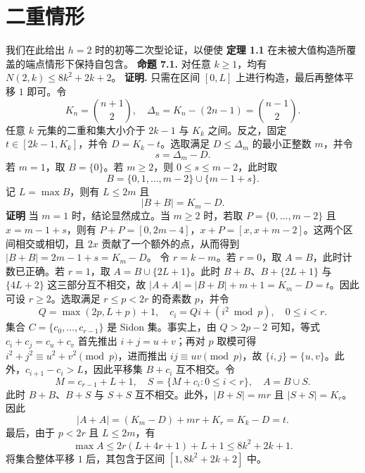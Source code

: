 \documentclass[11pt]{article}
\theoremstyle{break}
\begin{document}
\section{二重情形}
我们在此给出 $h=2$ 时的初等二次型论证，以便使
\textbf{定理 1.1}
在未被大值构造所覆盖的端点情形下保持自包含。
\textbf{命题 7.1.}
对任意 $k \ge 1$，均有 $N(2,k) \le 8k^2 + 2k + 2$。
\textbf{证明.}
只需在区间 $[0,L]$ 上进行构造，最后再整体平移 $1$ 即可。令
\[
K_n = \binom{n+1}{2}, \quad \Delta_n = K_n - (2n-1) = \binom{n-1}{2}.
\]
任意 $k$ 元集的二重和集大小介于 $2k-1$ 与 $K_k$ 之间。反之，固定 $t \in [2k-1, K_k]$，并令 $D = K_k - t$。选取满足 $D \le \Delta_m$ 的最小正整数 $m$，并令
\[
s = \Delta_m - D.
\]
若 $m=1$，取 $B=\{0\}$。若 $m \ge 2$，则 $0 \le s \le m-2$，此时取
\[
B = \{0,1,\dots,m-2\} \cup \{m-1+s\}.
\]
记 $L = \max B$，则有 $L \le 2m$ 且
\[
|B+B| = K_m - D.
\]
\textbf{证明}
当 $m=1$ 时，结论显然成立。当 $m \ge 2$ 时，若取 $P = \{0,\dots,m-2\}$ 且 $x = m-1+s$，则有 $P+P = [0,2m-4]$，$x+P = [x,x+m-2]$。这两个区间相交或相切，且 $2x$ 贡献了一个额外的点，从而得到 $|B+B| = 2m-1+s = K_m - D$。
令 $r = k - m$。若 $r = 0$，取 $A = B$，此时计数已正确。若 $r = 1$，取 $A = B \cup \{2L+1\}$。此时 $B+B$、$B+\{2L+1\}$ 与 $\{4L+2\}$ 这三部分互不相交，故 $|A+A| = |B+B|+m+1 = K_m - D = t$。因此可设 $r \ge 2$。选取满足 $r \le p < 2r$ 的奇素数 $p$，并令
\[ Q = \max(2p, L+p)+1, \quad c_i = Qi + (i^2 \bmod p), \quad 0 \le i < r. \]
集合 $C = \{c_0,\dots,c_{r-1}\}$ 是 Sidon 集。事实上，由 $Q > 2p-2$ 可知，等式 $c_i+c_j = c_u+c_v$ 首先推出 $i+j = u+v$；再对 $p$ 取模可得 $i^2+j^2 \equiv u^2+v^2 \pmod p$，进而推出 $ij \equiv uv \pmod p$，故 $\{i,j\} = \{u,v\}$。此外，$c_{i+1}-c_i > L$，因此平移集 $B+c_i$ 互不相交。令
\[ M = c_{r-1}+L+1, \quad S = \{M+c_i : 0 \le i < r\}, \quad A = B \cup S. \]
此时 $B+B$、$B+S$ 与 $S+S$ 互不相交。此外，$|B+S| = mr$ 且 $|S+S| = K_r$。因此
\[ |A+A| = (K_m-D)+mr+K_r = K_k-D = t. \]
最后，由于 $p < 2r$ 且 $L \le 2m$，有
\[ \max A \le 2r(L+4r+1)+L+1 \le 8k^2+2k+1. \]
将集合整体平移 $1$ 后，其包含于区间 $[1, 8k^2+2k+2]$ 中。
\end{document}
